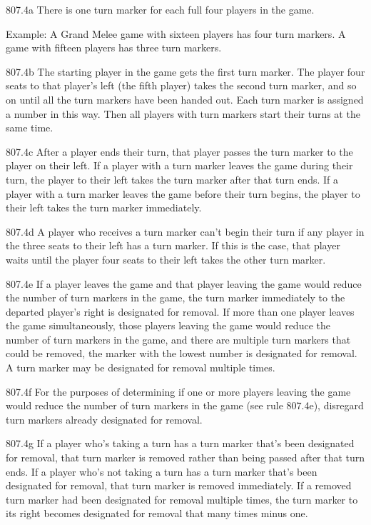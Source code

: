807.4a There is one turn marker for each full four players in the game.

Example: A Grand Melee game with sixteen players has four turn markers. A game with fifteen players has three turn markers.

807.4b The starting player in the game gets the first turn marker. The player four seats to that player’s left (the fifth player) takes the second turn marker, and so on until all the turn markers have been handed out. Each turn marker is assigned a number in this way. Then all players with turn markers start their turns at the same time.

807.4c After a player ends their turn, that player passes the turn marker to the player on their left. If a player with a turn marker leaves the game during their turn, the player to their left takes the turn marker after that turn ends. If a player with a turn marker leaves the game before their turn begins, the player to their left takes the turn marker immediately.

807.4d A player who receives a turn marker can’t begin their turn if any player in the three seats to their left has a turn marker. If this is the case, that player waits until the player four seats to their left takes the other turn marker.

807.4e If a player leaves the game and that player leaving the game would reduce the number of turn markers in the game, the turn marker immediately to the departed player’s right is designated for removal. If more than one player leaves the game simultaneously, those players leaving the game would reduce the number of turn markers in the game, and there are multiple turn markers that could be removed, the marker with the lowest number is designated for removal. A turn marker may be designated for removal multiple times.

807.4f For the purposes of determining if one or more players leaving the game would reduce the number of turn markers in the game (see rule 807.4e), disregard turn markers already designated for removal.

807.4g If a player who’s taking a turn has a turn marker that’s been designated for removal, that turn marker is removed rather than being passed after that turn ends. If a player who’s not taking a turn has a turn marker that’s been designated for removal, that turn marker is removed immediately. If a removed turn marker had been designated for removal multiple times, the turn marker to its right becomes designated for removal that many times minus one.

